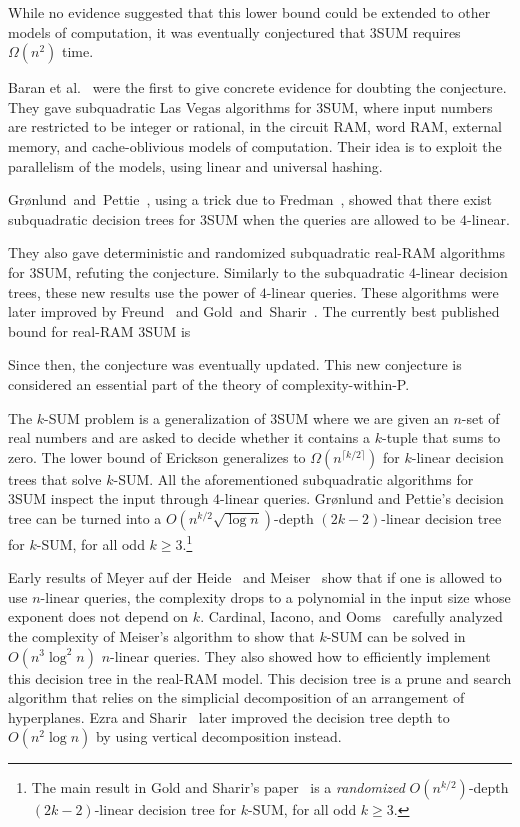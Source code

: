 While no evidence suggested that this lower bound could be extended to other
models of computation, it was eventually conjectured that 3SUM requires
$\Omega(n^2)$ time.

Baran et al.~\cite{BDP08} were the first to give concrete evidence
for doubting the conjecture.
They gave subquadratic Las Vegas algorithms for 3SUM, where input
numbers are restricted to be integer or rational, in the circuit RAM,
word RAM, external memory, and cache-oblivious models of computation. Their idea
is to exploit the parallelism of the models, using linear and
universal hashing.

Gr\o nlund~and~Pettie~\cite{GP18}, using a trick due to Fredman~\cite{Fr76},
showed that there exist subquadratic decision trees for 3SUM when the queries
are allowed to be $4$-linear.

They also gave deterministic and randomized
subquadratic real-RAM algorithms for 3SUM, refuting the conjecture.
Similarly to the subquadratic $4$-linear decision trees, these new results
use the power of $4$-linear queries.
%
These algorithms were later improved by Freund~\cite{Fr15} and
Gold~and~Sharir~\cite{GS15}.
The currently best published bound for real-RAM 3SUM is

Since then, the conjecture was eventually updated. This new conjecture is
considered an essential part of the theory of complexity-within-P.


The
$k$-SUM problem is a generalization of 3SUM where we are given an $n$-set of
real numbers and are asked to decide whether it contains a $k$-tuple that sums
to zero. The lower bound of Erickson generalizes to \( \Omega (n^{\lceil k/2
\rceil }) \) for \( k \)-linear decision trees that solve \( k \)-SUM\@.
All the aforementioned subquadratic algorithms for 3SUM inspect the input
through $4$-linear queries.  Gr\o nlund and Pettie's decision tree can be
turned into a \( O(n^{k/2} \sqrt{\log{n}}) \)-depth $(2k-2)$-linear decision
tree for $k$-SUM, for all odd $k \geq 3$.\footnote{The main result in Gold and Sharir's paper~\cite{GS15}
is a \emph{randomized} \(O(n^{k/2})\)-depth \((2k-2)\)-linear decision tree for
\(k\)-SUM, for all odd \(k \geq 3\).}

Early results of Meyer auf der Heide~\cite{M84} and Meiser~\cite{M93} show that if one is allowed to
use $n$-linear queries, the complexity drops to a polynomial in the input size
whose exponent does not depend on $k$. Cardinal, Iacono, and
Ooms~\cite{CIO16}
carefully analyzed the complexity of Meiser's algorithm to show that $k$-SUM
can be solved in \( O(n^3 \log^2 n) \) $n$-linear queries. They also showed how
to efficiently implement this decision tree in the real-RAM model. This decision
tree is a prune and search algorithm that relies on the simplicial
decomposition of an arrangement of hyperplanes. Ezra and
Sharir~\cite{ES17}
later improved the decision tree depth to \( O(n^2 \log n) \) by using
vertical decomposition instead.
%

